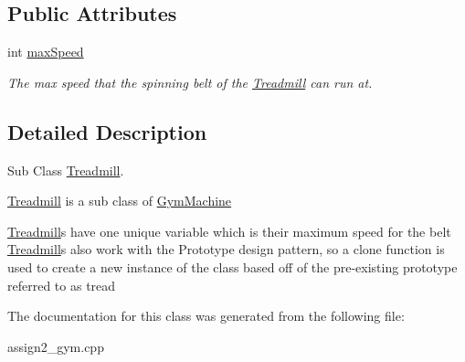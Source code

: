 \subsection*{Public Attributes}
\begin{DoxyCompactItemize}
\item 
\hypertarget{class_treadmill_a11186946bfc29bc3dc83aaf11fd5f22f}{}int \hyperlink{class_treadmill_a11186946bfc29bc3dc83aaf11fd5f22f}{max\+Speed}\label{class_treadmill_a11186946bfc29bc3dc83aaf11fd5f22f}

\begin{DoxyCompactList}\small\item\em The max speed that the spinning belt of the \hyperlink{class_treadmill}{Treadmill} can run at. \end{DoxyCompactList}\end{DoxyCompactItemize}


\subsection{Detailed Description}
Sub Class \hyperlink{class_treadmill}{Treadmill}. 

\hyperlink{class_treadmill}{Treadmill} is a sub class of \hyperlink{class_gym_machine}{Gym\+Machine}

\hyperlink{class_treadmill}{Treadmill}\textquotesingle{}s have one unique variable which is their maximum speed for the belt \hyperlink{class_treadmill}{Treadmill}\textquotesingle{}s also work with the Prototype design pattern, so a clone function is used to create a new instance of the class based off of the pre-\/existing prototype referred to as \textquotesingle{}tread\textquotesingle{} 

The documentation for this class was generated from the following file\+:\begin{DoxyCompactItemize}
\item 
assign2\+\_\+gym.\+cpp\end{DoxyCompactItemize}
